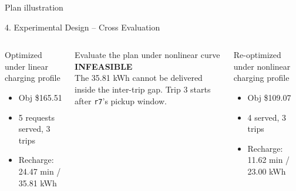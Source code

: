 \documentclass[10pt,aspectratio=169]{beamer}
\begin{document}
\begin{frame}{Plan illustration}
\centering
{}
\end{frame}

\begin{frame}{4. Experimental Design – Cross Evaluation}

\vspace{6pt}
\begin{columns}[T,onlytextwidth]
\begin{block}{Optimized under linear charging profile}
\begin{itemize}\itemsep1pt
\item Obj \$165.51\\
\item 5 requests served, 3 trips\\
\item Recharge: 24.47 min / 35.81 kWh
\end{itemize}
\end{block}

\begin{block}{Evaluate the plan under nonlinear curve}
\small \alert{\textbf{INFEASIBLE}}\\
The 35.81 kWh cannot be delivered inside the inter-trip gap. Trip 3 starts after \texttt{r7}'s pickup window.
\end{block}

\begin{block}{Re-optimized under nonlinear charging profile}
\begin{itemize}\itemsep1pt
\item Obj \$109.07\\
\item 4 served, 3 trips\\
\item Recharge: 11.62 min / 23.00 kWh
\end{itemize}
\end{block}
\end{columns}


\end{frame}
\end{document}
